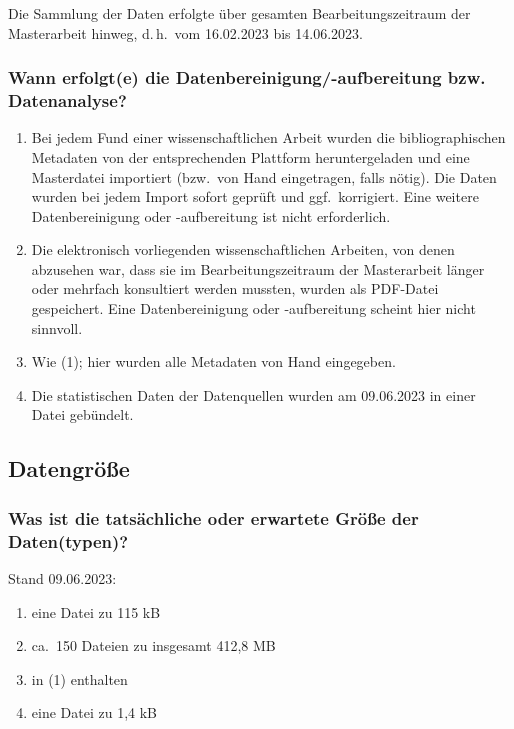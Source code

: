 \documentclass[%
  11pt,
  DIV=16,
  a4paper,
  BCOR=15mm,
  twoside=on,
  bibliography=totoc,
  headings=normal,
  numbers=noendperiod,
]{scrartcl}
\begin{document}
Die Sammlung der Daten erfolgte über gesamten Bearbeitungszeitraum der Masterarbeit hinweg, d.\,h.\ vom 16.02.2023 bis 14.06.2023.

\subsubsection{Wann erfolgt(e) die Datenbereinigung/-aufbereitung bzw. Datenanalyse?}

\begin{enumerate}[(1)]
  \item
    Bei jedem Fund einer wissenschaftlichen Arbeit wurden die bibliographischen Metadaten von der entsprechenden Plattform heruntergeladen
    und eine Masterdatei importiert (bzw.\ von Hand eingetragen, falls nötig). Die Daten wurden bei jedem Import sofort geprüft und ggf.\
    korrigiert. Eine weitere Datenbereinigung oder -aufbereitung ist nicht erforderlich.
  \item
    Die elektronisch vorliegenden wissenschaftlichen Arbeiten, von denen abzusehen war, dass sie im Bearbeitungszeitraum der Masterarbeit
    länger oder mehrfach konsultiert werden mussten, wurden als PDF-Datei gespeichert.
    Eine Datenbereinigung oder -aufbereitung scheint hier nicht sinnvoll.
  \item
    Wie (1); hier wurden alle Metadaten von Hand eingegeben.
  \item
    Die statistischen Daten der Datenquellen wurden am 09.06.2023 in einer Datei gebündelt.
\end{enumerate}

\subsection{Datengröße}

\subsubsection{Was ist die tatsächliche oder erwartete Größe der Daten(typen)?}

Stand 09.06.2023:
%
\begin{enumerate}[(1)]
  \item
    eine Datei zu 115 kB
  \item
    ca.\ 150 Dateien zu insgesamt 412,8 MB
  \item
    in (1) enthalten
  \item
    eine Datei zu 1,4 kB
\end{enumerate}
\end{document}
